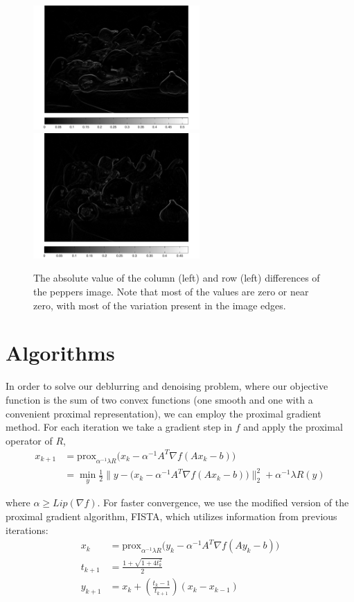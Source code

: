 \documentclass[10pt,a4paper]{article}
\newcommand{\prox}{\mathrm{prox}}
\begin{document}
	\begin{figure}[H]
		\centering
		\includegraphics[width=2.5in]{../figures/diff1} \quad
		\includegraphics[width=2.5in]{../figures/diff2}
		\caption{The absolute value of the column (left) and row (left) differences of the peppers image. Note that most of the values are zero or near zero, with most of the variation present in the image edges. }
	\end{figure}
	
	\section{Algorithms}
	In order to solve our deblurring and denoising problem, where our objective function is the sum of two convex functions (one smooth and one with a convenient proximal representation), we can employ the proximal gradient method. For each iteration we take a gradient step in $f$ and apply the proximal operator of $R$,
	\begin{equation}
	\begin{aligned}
	x_{k+1} &= \prox_{\alpha^{-1}\lambda R}\big(x_k - \alpha^{-1} A^T \nabla f(Ax_k-b)\big) \\
	&= \min_y \frac{1}{2} \Big\| y - \big(x_k - \alpha^{-1} A^T \nabla f(Ax_k-b) \big)\Big\|_2^2 + \alpha^{-1}\lambda R(y)
	\end{aligned}
	\end{equation}
	
	where $\alpha \geq Lip(\nabla f)$. For faster convergence, we use the modified version of the proximal gradient algorithm, FISTA, which utilizes information from previous iterations:
	\begin{equation}
	\begin{aligned}
	x_{k} &= \prox_{\alpha^{-1}\lambda R}\big(y_k - \alpha^{-1} A^T \nabla f(Ay_k-b)\big) \\[1ex]
	t_{k+1} &= \frac{1+\sqrt{1+4t_k^2}}{2} \\
	y_{k+1} &= x_k + \left( \frac{t_k-1}{t_{k+1}} \right) (x_k - x_{k-1})
	\end{aligned}
	\end{equation}
	
\end{document}
